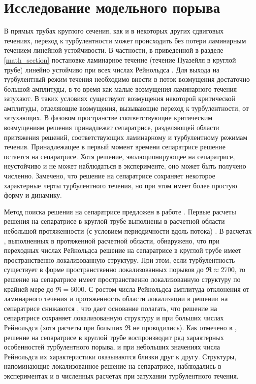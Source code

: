 
\chapter{Исследование модельного порыва}


В прямых трубах круглого сечения, как и в некоторых других сдвиговых течениях, переход к турбулентности может происходить без потери ламинарным течением линейной устойчивости. В частности, в приведенной в разделе \ref{math_section} постановке ламинарное течение (течение Пуазейля в круглой трубе) линейно устойчиво при всех числах Рейнольдса \cite{Kerswell2005}. Для выхода на турбулентный режим течения необходимо внести в поток возмущения достаточно большой амплитуды, в то время как малые возмущения ламинарного течения затухают. В таких условиях существуют возмущения некоторой критической амплитуды, отделяющие возмущения, вызывающие переход к турбулентности, от затухающих. В фазовом пространстве соответствующие критическим возмущениям решения принадлежат сепаратрисе, разделяющей области притяжения решений, соответствующих ламинарному и турбулентному режимам течения. Принадлежащее в первый момент времени сепаратрисе решение остается на сепаратрисе. Хотя решение, эволюционирующее на сепаратрисе, неустойчиво и не может наблюдаться в эксперименте, оно может быть получено численно. Замечено, что решение на сепаратрисе сохраняет некоторое характерные черты турбулентного течения, но при этом имеет более простую форму и динамику. 

Метод поиска решения на сепаратрисе предложен в работе \cite{Skufca2006}. Первые расчеты решения на сепаратрисе в круглой трубе выполнены в расчетной области небольшой протяженности (с условием периодичности вдоль потока) \cite{Schneider2007}. В расчетах \cite{Mellibovsky2009transition, Duguet2010}, выполненных в протяженной расчетной области, обнаружено, что при переходных числах Рейнольдса решение на сепаратрисе в круглой трубе имеет пространственно локализованную структуру. При этом, если турбулентность существует в форме пространственно локализованных порывов до $\Re \approx 2700$, то решение на сепаратрисе имеет пространственно локализованную структуру по крайней мере до $\Re = 6000$. С ростом числа Рейнольдса амплитуда отклонения от ламинарного течения и протяженность области локализации в решении на сепаратрисе снижаются \cite{Duguet2010}, что дает основание полагать, что решение на сепаратрисе сохраняет локализованную структуру и при больших числах Рейнольдса (хотя расчеты при больших $\Re$ не проводились). Как отмечено в \cite{Duguet2010, Avila2013}, решение на сепаратрисе в круглой трубе воспроизводит ряд характерных особенностей турбулентного порыва, и при небольших значениях числа Рейнольдса их характеристики оказываются близки друг к другу. Структуры, напоминающие локализованное решение на сепаратрисе, наблюдались в экспериментах \cite{deLozar2012} и в численных расчетах \cite{Manneville2011} при затухании турбулентного течения. 

